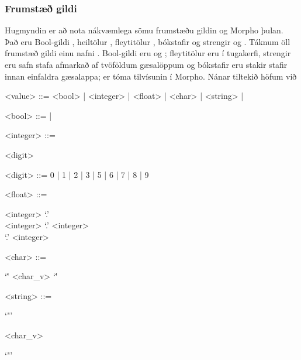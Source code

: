 \documentclass[a4paper,icelandic]{article}
\begin{document}
\subsubsection{Frumstæð gildi}
\label{sec:frumstad-gildi-1}
Hugmyndin er að nota nákvæmlega sömu frumstæðu gildin og Morpho
þulan. Það eru Bool-gildi , heiltölur ,
fleytitölur , bókstafir  og strengir
 og .  Táknum öll frumstæð gildi einu nafni
. Bool-gildi eru  og ; fleytitölur
eru í tugakerfi, strengir eru safn stafa afmarkað af tvöföldum
gæsalöppum og bókstafir eru stakir stafir innan einfaldra gæsalappa;
 er tóma tilvísunin í Morpho.  Nánar tiltekið höfum við
\begin{grammar}
  <value> ::= <bool> | <integer> | <float> | <char> | <string> |

  <bool> ::=  | 
  
  <integer> ::=
  \begin{syntdiag*} \begin{rep} <digit> \end{rep} \end{syntdiag*}

  <digit> ::= 0 | 1 | 2 | 3 | 5 | 6 | 7 | 8 | 9

  <float> ::=
  \begin{syntdiag*}
    \begin{stack}
      <integer> `.'
      \\
      <integer> `.' <integer>
      \\
      `.' <integer>
    \end{stack}
  \end{syntdiag*}

  <char> ::= \begin{syntdiag*}`\'' <char\_v> `\''\end{syntdiag*}

  <string> ::=
  \begin{syntdiag*}
    `"'
    \begin{rep}
      <char\_v>
    \end{rep}
    `"'
  \end{syntdiag*}


\end{grammar}
\end{document}

